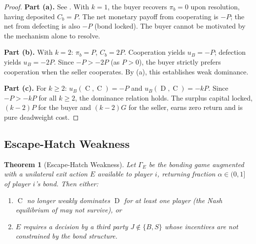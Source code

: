 \documentclass[11pt,a4paper]{article}
\newtheorem{theorem}{Theorem}[section]
\theoremstyle{definition}
\theoremstyle{remark}
\newcommand{\pay}{P}           %
\newcommand{\cumval}{G}        %
\newcommand{\bbond}{C_b}       %
\newcommand{\bpay}{\pi_b}      %
\newcommand{\ub}{u_B}          %
\DeclareMathOperator{\Coop}{C}
\DeclareMathOperator{\Def}{D}
\begin{document}
\begin{proof}
\textbf{Part (a).} See . With $k = 1$, the buyer
recovers $\bpay = 0$ upon resolution, having deposited $\bbond = \pay$.
The net monetary payoff from cooperating is $-\pay$; the net from
defecting is also $-\pay$ (bond locked). The buyer cannot be motivated
by the mechanism alone to resolve.

\textbf{Part (b).} With $k = 2$: $\bpay = \pay$, $\bbond = 2\pay$.
Cooperation yields $\ub = -\pay$; defection yields $\ub = -2\pay$.
Since $-\pay > -2\pay$ (as $\pay > 0$), the buyer strictly prefers
cooperation when the seller cooperates. By
(a), this establishes weak dominance.

\textbf{Part (c).} For $k \geq 2$:
$\ub(\Coop, \Coop) = -\pay$ and $\ub(\Def, \Coop) = -k\pay$.
Since $-\pay > -k\pay$ for all $k \geq 2$, the dominance relation
holds. The surplus capital locked, $(k - 2)\pay$ for the buyer and
$(k - 2)\cumval$ for the seller, earns zero return and is pure
deadweight cost.
\end{proof}

\subsection{Escape-Hatch Weakness}

\begin{theorem}[Escape-Hatch Weakness]
\label{thm:escape-hatch-weakness}
Let $\Gamma_E$ be the bonding game augmented with a unilateral exit
action $E$ available to player $i$, returning fraction $\alpha \in (0, 1]$
of player $i$'s bond. Then either:
\begin{enumerate}[label=(\alph*)]
  \item $\Coop$ no longer weakly dominates $\Def$ for at least one
    player (the Nash equilibrium of 
    may not survive), or
  \item $E$ requires a decision by a third party $J \notin \{B, S\}$
    whose incentives are not constrained by the bond structure.
\end{enumerate}
\end{theorem}
\end{document}

